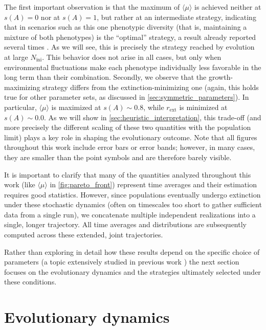 \documentclass[aps,pre,reprint,10pt,superscriptaddress]{revtex4-2}
\begin{document}
The first important observation is that the maximum of $\langle\mu\rangle$ is achieved neither at $s(A)=0$ nor at $s(A)=1$, but rather at an intermediate strategy, indicating that in scenarios such as this one phenotypic diversity (that is, maintaining a mixture of both phenotypes) is the ``optimal'' strategy, a result already reported several times \cite{kussellPhenotypicDiversityPopulation2005,xueBetHedgingDemographic2017,dinisPhaseTransitionsOptimal2020,dinisParetooptimalTradeoffPhenotypic2022}. As we will see, this is precisely the strategy reached by evolution at large $N_\text{ini}$. This behavior does not arise in all cases, but only when environmental fluctuations make each phenotype individually less favorable in the long term than their combination. Secondly, we observe that the growth-maximizing strategy differs from the extinction-minimizing one (again, this holds true for other parameter sets, as discussed in \cref{sec:symmetric_parameters}). In particular, $\langle\mu\rangle$ is maximized at $s(A)\sim0.8$, while $r_\text{ext}$ is minimized at $s(A)\sim0.0$. As we will show in \cref{sec:heuristic_interpretation}, this trade-off (and more precisely the different scaling of these two quantities with the population limit) plays a key role in shaping the evolutionary outcome. Note that all figures throughout this work include error bars or error bands; however, in many cases, they are smaller than the point symbols and are therefore barely visible.

It is important to clarify that many of the quantities analyzed throughout this work (like $\langle\mu\rangle$ in \cref{fig:pareto_front}) represent time averages and their estimation requires good statistics. However, since populations eventually undergo extinction under these stochastic dynamics (often on timescales too short to gather sufficient data from a single run), we concatenate multiple independent realizations into a single, longer trajectory. All time averages and distributions are subsequently computed across these extended, joint trajectories.

Rather than exploring in detail how these results depend on the specific choice of parameters (a topic extensively studied in previous work \cite{kussellPhenotypicDiversityPopulation2005,patraEmergencePhenotypeSwitching2015,dinisParetooptimalTradeoffPhenotypic2022}) the next section focuses on the evolutionary dynamics and the strategies ultimately selected under these conditions.

\section{Evolutionary dynamics} \label{sec:evol_outcome}
\end{document}
